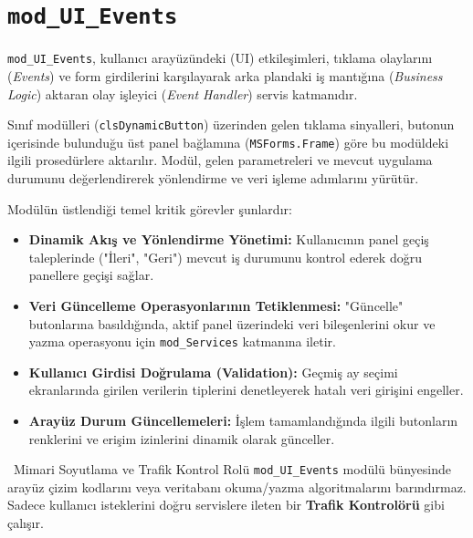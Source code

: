 \newpage


\section{\texttt{mod\_UI\_Events}}

\texttt{mod\_UI\_Events}, kullanıcı arayüzündeki (UI) etkileşimleri, tıklama olaylarını (\textit{Events}) ve form girdilerini karşılayarak arka plandaki iş mantığına (\textit{Business Logic}) aktaran olay işleyici (\textit{Event Handler}) servis katmanıdır.

Sınıf modülleri (\texttt{clsDynamicButton}) üzerinden gelen tıklama sinyalleri, butonun içerisinde bulunduğu üst panel bağlamına (\texttt{MSForms.Frame}) göre bu modüldeki ilgili prosedürlere aktarılır. Modül, gelen parametreleri ve mevcut uygulama durumunu değerlendirerek yönlendirme ve veri işleme adımlarını yürütür.

Modülün üstlendiği temel kritik görevler şunlardır:

\begin{itemize}\setlength{\itemsep}{0pt}\setlength{\parskip}{0pt}
    \item \textbf{Dinamik Akış ve Yönlendirme Yönetimi:} Kullanıcının panel geçiş taleplerinde ("İleri", "Geri") mevcut iş durumunu kontrol ederek doğru panellere geçişi sağlar.
    \item \textbf{Veri Güncelleme Operasyonlarının Tetiklenmesi:} "Güncelle" butonlarına basıldığında, aktif panel üzerindeki veri bileşenlerini okur ve yazma operasyonu için \texttt{mod\_Services} katmanına iletir.
    \item \textbf{Kullanıcı Girdisi Doğrulama (Validation):} Geçmiş ay seçimi ekranlarında girilen verilerin tiplerini denetleyerek hatalı veri girişini engeller.
    \item \textbf{Arayüz Durum Güncellemeleri:} İşlem tamamlandığında ilgili butonların renklerini ve erişim izinlerini dinamik olarak günceller.
\end{itemize}

\vspace{0.15cm}

\begin{infobox}{\faHandPointer\ Mimari Soyutlama ve Trafik Kontrol Rolü}
\texttt{mod\_UI\_Events} modülü bünyesinde arayüz çizim kodlarını veya veritabanı okuma/yazma algoritmalarını barındırmaz. Sadece kullanıcı isteklerini doğru servislere ileten bir \textbf{Trafik Kontrolörü} gibi çalışır.
\end{infobox}

